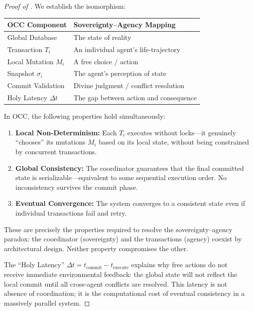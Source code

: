 \documentclass[12pt, a4paper]{article}
\theoremstyle{plain}
\theoremstyle{definition}
\theoremstyle{remark}
\begin{document}
\begin{proof}[Proof of ]
  We establish the isomorphism:
  \begin{center}
  \begin{tabular}{ll}
    \toprule
    \textbf{OCC Component} & \textbf{Sovereignty--Agency Mapping} \\
    \midrule
    Global Database & The state of reality \\
    Transaction $T_i$ & An individual agent's life-trajectory \\
    Local Mutation $M_i$ & A free choice / action \\
    Snapshot $\sigma_i$ & The agent's perception of state \\
    Commit Validation & Divine judgment / conflict resolution \\
    Holy Latency $\Delta t$ & The gap between action and consequence \\
    \bottomrule
  \end{tabular}
  \end{center}

  In OCC, the following properties hold simultaneously:
  \begin{enumerate}[label=(\roman*)]
    \item \textbf{Local Non-Determinism:} Each $T_i$ executes without
      locks---it genuinely ``chooses'' its mutations $M_i$ based on its
      local state, without being constrained by concurrent transactions.
    \item \textbf{Global Consistency:} The coordinator guarantees that the
      final committed state is serializable---equivalent to some sequential
      execution order. No inconsistency survives the commit phase.
    \item \textbf{Eventual Convergence:} The system converges to a consistent
      state even if individual transactions fail and retry.
  \end{enumerate}

  These are precisely the properties required to resolve the sovereignty--agency
  paradox: the coordinator (sovereignty) and the transactions (agency) coexist
  by architectural design. Neither property compromises the other.

  The ``Holy Latency'' $\Delta t = t_{\text{commit}} - t_{\text{execute}}$
  explains why free actions do not receive immediate environmental feedback:
  the global state will not reflect the local commit until all cross-agent
  conflicts are resolved. This latency is not absence of coordination; it
  is the computational cost of eventual consistency in a massively parallel
  system. \qedhere
\end{proof}
\end{document}
